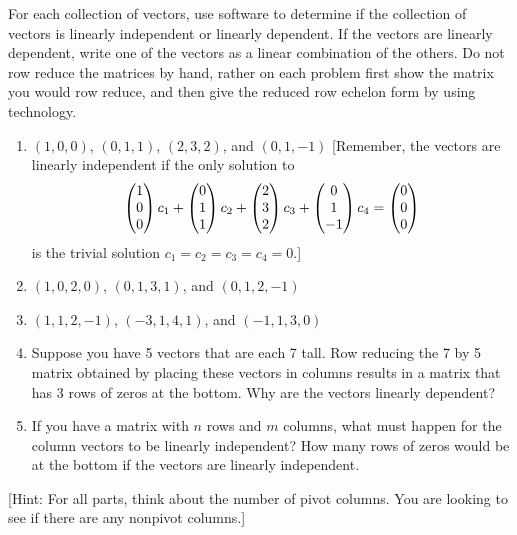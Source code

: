 \begin{problem}
For each collection of vectors, use software to determine if the collection of vectors is linearly independent or linearly dependent.  If the vectors are linearly dependent, write one of the vectors as a linear combination of the others. Do not row reduce the matrices by hand, rather on each problem first show the matrix you would row reduce, and then give the reduced row echelon form by using technology.
\begin{enumerate}
 \item $(1,0,0)$, $(0,1,1)$, $(2,3,2)$, and $(0,1,-1)$ 
[Remember, the vectors are linearly independent if the only solution to 
$$\begin{pmatrix} 1\\0\\0 \end{pmatrix}c_1+\begin{pmatrix} 0\\1\\1 \end{pmatrix}c_2+\begin{pmatrix} 2\\3\\2 \end{pmatrix}c_3+\begin{pmatrix} 0\\1\\-1 \end{pmatrix}c_4=\begin{pmatrix} 0\\0\\0 \end{pmatrix}$$ is the trivial solution $c_1=c_2=c_3=c_4=0$.]
 \item $(1,0,2,0)$, $(0,1,3,1)$, and $(0,1,2,-1)$
 \item $(1,1,2,-1)$, $(-3,1,4,1)$, and $(-1,1,3,0)$
 \item Suppose you have 5 vectors that are each 7 tall. Row reducing the 7 by 5 matrix obtained by placing these vectors in columns results in a matrix that has 3 rows of zeros at the bottom.  Why are the vectors linearly dependent?
 \item If you have a matrix with $n$ rows and $m$ columns, what must happen for the column vectors to be linearly independent?  How many rows of zeros would be at the bottom if the vectors are linearly independent. 
\end{enumerate}
[Hint: For all parts, think about the number of pivot columns. You are looking to see if there are any nonpivot columns.]
\end{problem}





